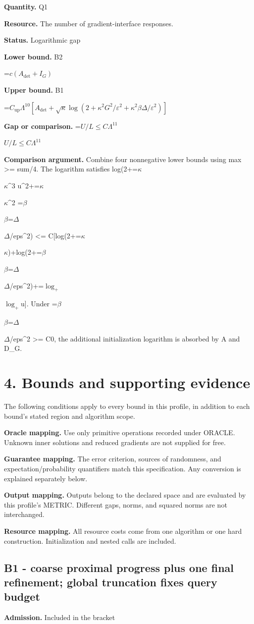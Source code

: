 \documentclass[10pt,a4paper]{article}
\newcommand{\AtlasMath}[1]{\par\begingroup\centering\setbox0=\hbox{$\displaystyle #1$}\ifdim\wd0>1.4\linewidth\typeout{ATLAS WIDE FORMULA: \the\wd0}\fi\ifdim\wd0>\linewidth\resizebox{\linewidth}{!}{\box0}\else\box0\fi\par\endgroup}
\newcommand{\AtlasInlineMath}[1]{\begingroup\setbox0=\hbox{$#1$}\ifdim\wd0>.4\linewidth\endgroup\AtlasMath{#1}\else\endgroup$#1$\fi}
\begin{document}
\textbf{Quantity.} Q1

\textbf{Resource.} The number of gradient-interface responses.

\textbf{Status.} Logarithmic gap

\textbf{Lower bound.} B2

\AtlasMath{c(A_{\mathrm{det}}+I_G)}
\textbf{Upper bound.} B1

\AtlasMath{C_{\mathrm{up}}\Lambda^{10}[A_{\mathrm{det}}+\sqrt\kappa\log(2+\kappa^2G^2/\varepsilon^2+\kappa^2\beta\Delta/\varepsilon^2)]}
\textbf{Gap or comparison.} \AtlasInlineMath{U/L\le C\Lambda^{11}}

\textbf{Comparison argument.} Combine four nonnegative lower bounds using max >= sum/4. The logarithm satisfies log(2+\AtlasInlineMath{\kappa}\textasciicircum{}3 u\textasciicircum{}2+\AtlasInlineMath{\kappa}\textasciicircum{}2 \AtlasInlineMath{\beta}\AtlasInlineMath{\Delta}/eps\textasciicircum{}2) <= C[log(2+\AtlasInlineMath{\kappa})+log(2+\AtlasInlineMath{\beta}\AtlasInlineMath{\Delta}/eps\textasciicircum{}2)+\AtlasInlineMath{\log_+}u]. Under \AtlasInlineMath{\beta}\AtlasInlineMath{\Delta}/eps\textasciicircum{}2 >= C0, the additional initialization logarithm is absorbed by A and D\_G.

\section{4. Bounds and supporting evidence}
The following conditions apply to every bound in this profile, in addition to each bound's stated region and algorithm scope.

\textbf{Oracle mapping.} Use only primitive operations recorded under ORACLE. Unknown inner solutions and reduced gradients are not supplied for free.

\textbf{Guarantee mapping.} The error criterion, sources of randomness, and expectation/probability quantifiers match this specification. Any conversion is explained separately below.

\textbf{Output mapping.} Outputs belong to the declared space and are evaluated by this profile's METRIC. Different gaps, norms, and squared norms are not interchanged.

\textbf{Resource mapping.} All resource costs come from one algorithm or one hard construction. Initialization and nested calls are included.

\subsection{B1 - coarse proximal progress plus one final refinement; global truncation fixes query budget}
\textbf{Admission.} Included in the bracket
\end{document}
